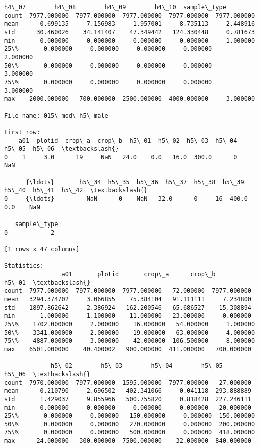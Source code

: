 \documentclass[11pt]{article}
\begin{document}
\begin{Verbatim}[commandchars=\\\{\}]
             h4\_07        h4\_08        h4\_09        h4\_10  sample\_type  
count  7977.000000  7977.000000  7977.000000  7977.000000  7977.000000  
mean      0.699135     7.156983     1.957001     8.735113     2.448916  
std      30.460026    34.141407    47.349442   124.330448     0.781673  
min       0.000000     0.000000     0.000000     0.000000     1.000000  
25\%       0.000000     0.000000     0.000000     0.000000     2.000000  
50\%       0.000000     0.000000     0.000000     0.000000     3.000000  
75\%       0.000000     0.000000     0.000000     0.000000     3.000000  
max    2000.000000   700.000000  2500.000000  4000.000000     3.000000  

File name: 015\_mod\_h5\_male

First row: 
    a01  plotid  crop\_a  crop\_b  h5\_01  h5\_02  h5\_03  h5\_04  h5\_05  h5\_06  \textbackslash{}
0    1     3.0      19     NaN   24.0    0.0   16.0  300.0      0    NaN   

      {\ldots}       h5\_34  h5\_35  h5\_36  h5\_37  h5\_38  h5\_39  h5\_40  h5\_41  h5\_42  \textbackslash{}
0     {\ldots}         NaN      0    NaN   32.0      0     16  400.0    0.0    NaN   

   sample\_type  
0            2  

[1 rows x 47 columns]

Statistics: 
                a01       plotid       crop\_a      crop\_b        h5\_01  \textbackslash{}
count  7977.000000  7977.000000  7977.000000   72.000000  7977.000000   
mean   3294.374702     3.066855    75.384104   91.111111     7.234800   
std    1897.862642     2.386924   162.200546   65.686527    15.308894   
min       1.000000     1.100000    11.000000   23.000000     0.000000   
25\%    1702.000000     2.000000    16.000000   54.000000     1.000000   
50\%    3341.000000     2.000000    19.000000   63.000000     4.000000   
75\%    4887.000000     3.000000    42.000000  106.500000     8.000000   
max    6501.000000    40.400002   900.000000  411.000000   700.000000   

             h5\_02        h5\_03        h5\_04        h5\_05       h5\_06  \textbackslash{}
count  7970.000000  7977.000000  1595.000000  7977.000000   27.000000   
mean      0.210790     2.696502   402.341066     0.041118  293.888889   
std       1.429037     9.855966   500.755820     0.818428  227.246111   
min       0.000000     0.000000     0.000000     0.000000   20.000000   
25\%       0.000000     0.000000   150.000000     0.000000  150.000000   
50\%       0.000000     0.000000   270.000000     0.000000  200.000000   
75\%       0.000000     0.000000   500.000000     0.000000  418.000000   
max      24.000000   300.000000  7500.000000    32.000000  840.000000   


\end{Verbatim}
\end{document}
